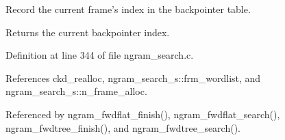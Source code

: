 \-Record the current frame's index in the backpointer table. 

\begin{DoxyReturn}{\-Returns}
the current backpointer index. 
\end{DoxyReturn}


\-Definition at line 344 of file ngram\-\_\-search.\-c.



\-References ckd\-\_\-realloc, ngram\-\_\-search\-\_\-s\-::frm\-\_\-wordlist, and ngram\-\_\-search\-\_\-s\-::n\-\_\-frame\-\_\-alloc.



\-Referenced by ngram\-\_\-fwdflat\-\_\-finish(), ngram\-\_\-fwdflat\-\_\-search(), ngram\-\_\-fwdtree\-\_\-finish(), and ngram\-\_\-fwdtree\-\_\-search().

